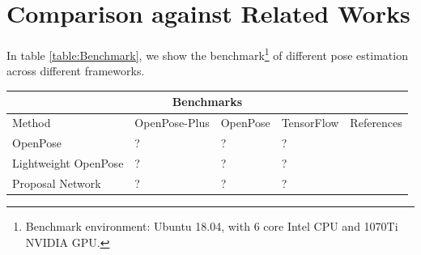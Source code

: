 \documentclass[twoside,11pt]{article}
\begin{document}


\section{Comparison against Related Works}


In table \ref{table:Benchmark}, we show the benchmark\footnote{Benchmark environment: Ubuntu 18.04, with 6 core Intel CPU and 1070Ti NVIDIA GPU.} of different pose estimation across different frameworks.

\begin{tabular}{ |p{3.8cm}||p{2.7cm}|p{1.9cm}|p{1.9cm}|p{2.7cm}|}
 \hline
 \multicolumn{5}{|c|}{\textbf{Benchmarks}} \\
 \hline
 Method              & OpenPose-Plus &OpenPose&TensorFlow&References\\
 \hline
OpenPose             &?              &?       &?         &\citep{x}\\
Lightweight OpenPose &?              &?       &?         &\citep{x}\\
Proposal Network     &?              &?       &?         &\citep{x}\\
 \hline
\end{tabular}\label{table:Benchmark}
\end{document}
